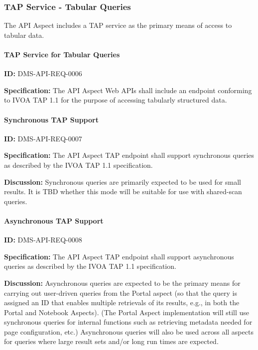 \documentclass[SE,toc,lsstdraft]{lsstdoc}
\begin{document}
\subsubsection{TAP Service - Tabular Queries}

The API Aspect includes a TAP service as the primary means of access to tabular data.

\paragraph{TAP Service for Tabular Queries}\hfill  %

\label{DMS-API-REQ-0006}
\textbf{ID:} DMS-API-REQ-0006

\textbf{Specification:}
The API Aspect Web APIs shall include an endpoint conforming to IVOA TAP 1.1 for the purpose of accessing tabularly structured data.

\paragraph{Synchronous TAP Support}\hfill  %

\label{DMS-API-REQ-0007}
\textbf{ID:} DMS-API-REQ-0007

\textbf{Specification:}
The API Aspect TAP endpoint shall support synchronous queries as described by the IVOA TAP 1.1 specification.

\textbf{Discussion:}
Synchronous queries are primarily expected to be used for small results.  It is TBD whether this mode will be suitable for use with shared-scan queries.

\paragraph{Asynchronous TAP Support}\hfill  %

\label{DMS-API-REQ-0008}
\textbf{ID:} DMS-API-REQ-0008

\textbf{Specification:}
The API Aspect TAP endpoint shall support asynchronous queries as described by the IVOA TAP 1.1 specification.

\textbf{Discussion:}
Asynchronous queries are expected to be the primary means for carrying out user-driven queries from the Portal aspect (so that the query is assigned an ID that enables multiple retrievals of its results, e.g., in both the Portal and Notebook Aspects). (The Portal Aspect implementation will still use synchronous queries for internal functions such as retrieving metadata needed for page configuration, etc.) Asynchronous queries will also be used across all aspects for queries where large result sets and/or long run times are expected.
\end{document}
